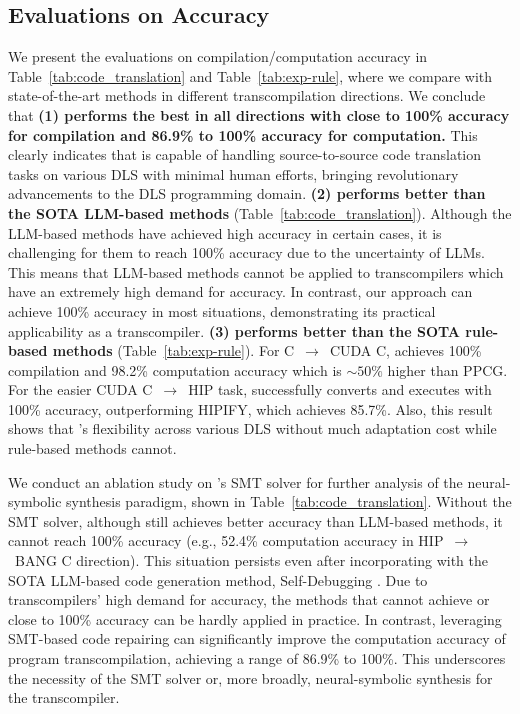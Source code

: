 \subsection{Evaluations on Accuracy}
We present the evaluations on compilation/computation accuracy in Table~\ref{tab:code_translation} and Table~\ref{tab:exp-rule}, where we compare \name{} with state-of-the-art methods in different transcompilation directions.
We conclude that
\textbf{(1) \name{} performs the best in all directions with close to 100\% accuracy for compilation and 86.9\% to 100\% accuracy for computation.} This clearly indicates that \name{} is capable of handling source-to-source code translation tasks on various DLS with minimal human efforts, bringing revolutionary advancements to the DLS programming domain.
\textbf{(2) \name{} performs better than the SOTA LLM-based methods} (Table~\ref{tab:code_translation}). Although the LLM-based methods have achieved high accuracy in certain cases, it is challenging for them to reach 100\% accuracy due to the uncertainty of LLMs. This means that LLM-based methods cannot be applied to transcompilers which have an extremely high demand for accuracy. In contrast, our approach can achieve 100\% accuracy in most situations, demonstrating its practical applicability as a transcompiler.
\textbf{(3) \name{} performs better than the SOTA rule-based methods} (Table~\ref{tab:exp-rule}). For C~$\rightarrow$~CUDA C, \name{} achieves 100\% compilation and 98.2\% computation accuracy which is $\sim50\%$ higher than PPCG. For the easier CUDA C~$\rightarrow$~HIP task, \name{} successfully converts and executes with 100\% accuracy, outperforming HIPIFY, which achieves 85.7\%. 
Also, this result shows that \name{}'s flexibility across various DLS without much adaptation cost while rule-based methods cannot.

We conduct an ablation study on \name{}'s SMT solver for further analysis of the neural-symbolic synthesis paradigm, shown in Table~\ref{tab:code_translation}.
Without the SMT solver, although \name{} still achieves better accuracy than LLM-based methods, it cannot reach 100\% accuracy (e.g., 52.4\% computation accuracy in HIP~$\rightarrow$~BANG C direction). This situation persists even after incorporating \name{} with the SOTA LLM-based code generation method, Self-Debugging
\cite{chen2023teaching}. Due to transcompilers' high demand for accuracy, the methods that cannot achieve or close to 100\% accuracy can be hardly applied in practice. 
In contrast, leveraging SMT-based code repairing can significantly improve the computation accuracy of program transcompilation, achieving a range of 86.9\% to 100\%.
This underscores the necessity of the SMT solver or, more broadly, neural-symbolic synthesis for the transcompiler.

